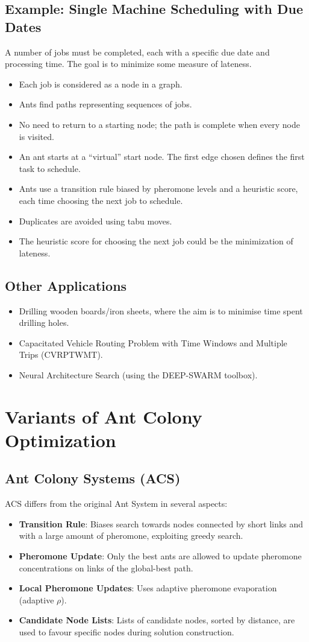 \subsection*{Example: Single Machine Scheduling with Due Dates}
A number of jobs must be completed, each with a specific due date and processing time. The goal is to minimize some measure of lateness.
\begin{itemize}
    \item Each job is considered as a node in a graph.
    \item Ants find paths representing sequences of jobs.
    \item No need to return to a starting node; the path is complete when every node is visited.
    \item An ant starts at a “virtual” start node. The first edge chosen defines the first task to schedule.
    \item Ants use a transition rule biased by pheromone levels and a heuristic score, each time choosing the next job to schedule.
    \item Duplicates are avoided using tabu moves.
    \item The heuristic score for choosing the next job could be the minimization of lateness.
\end{itemize}
\subsection*{Other Applications}
\begin{itemize}
    \item Drilling wooden boards/iron sheets, where the aim is to minimise time spent drilling holes.
   \item Capacitated Vehicle Routing Problem with Time Windows and Multiple Trips (CVRPTWMT).
   \item Neural Architecture Search (using the DEEP-SWARM toolbox).
\end{itemize}
\section{Variants of Ant Colony Optimization}
\subsection*{Ant Colony Systems (ACS)}
ACS differs from the original Ant System in several aspects:
\begin{itemize}
    \item \textbf{Transition Rule}: Biases search towards nodes connected by short links and with a large amount of pheromone, exploiting greedy search.
    \item \textbf{Pheromone Update}: Only the best ants are allowed to update pheromone concentrations on links of the global-best path.
    \item \textbf{Local Pheromone Updates}: Uses adaptive pheromone evaporation (adaptive $\rho$).
     \item \textbf{Candidate Node Lists}: Lists of candidate nodes, sorted by distance, are used to favour specific nodes during solution construction.
\end{itemize}
